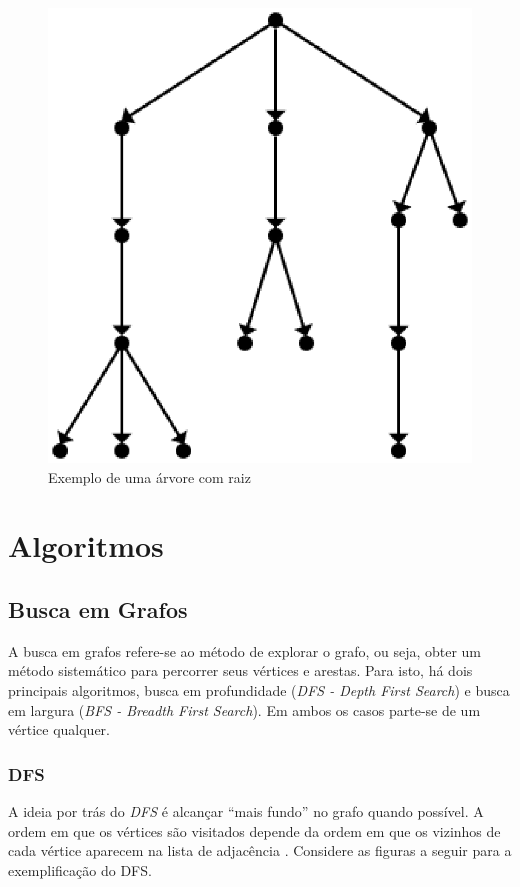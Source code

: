 \begin{figure}[!h]
	\centering
	\includegraphics[scale=0.3]{figuras/capitulo1/arvore_raiz.eps}
	\caption{Exemplo de uma árvore com raiz}
	\label{arvore_raiz}
\end{figure}

\section{Algoritmos}

\subsection{Busca em Grafos}

A busca em grafos refere-se ao método de explorar o grafo, ou seja, obter um método sistemático para percorrer seus vértices e arestas. Para isto, há dois principais algoritmos, busca em profundidade (\textit{DFS - Depth First Search}) e busca em largura (\textit{BFS - Breadth First Search}). Em ambos os casos parte-se de um vértice qualquer.

\subsubsection{DFS}
A ideia por trás do \textit{DFS} é alcançar ``mais fundo'' no grafo quando possível. A ordem em que os vértices são visitados depende da ordem em que os vizinhos de cada vértice aparecem na lista de adjacência \cite{Cormen:2001}. Considere as figuras a seguir para a exemplificação do DFS.

